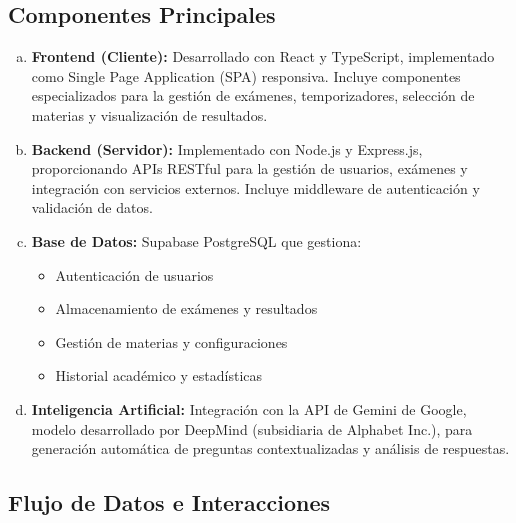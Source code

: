 \documentclass[12pt,a4paper]{report}
\begin{document}
\subsection{Componentes Principales}

\begin{enumerate}[a.]
\item \textbf{Frontend (Cliente):} Desarrollado con React y TypeScript, implementado como Single Page Application (SPA) responsiva. Incluye componentes especializados para la gestión de exámenes, temporizadores, selección de materias y visualización de resultados.

\item \textbf{Backend (Servidor):} Implementado con Node.js y Express.js, proporcionando APIs RESTful para la gestión de usuarios, exámenes y integración con servicios externos. Incluye middleware de autenticación y validación de datos.

\item \textbf{Base de Datos:} Supabase PostgreSQL que gestiona:
\begin{itemize}
\item Autenticación de usuarios
\item Almacenamiento de exámenes y resultados  
\item Gestión de materias y configuraciones
\item Historial académico y estadísticas
\end{itemize}

\item \textbf{Inteligencia Artificial:} Integración con la API de Gemini de Google, modelo desarrollado por DeepMind (subsidiaria de Alphabet Inc.), para generación automática de preguntas contextualizadas y análisis de respuestas.
\end{enumerate}

\subsection{Flujo de Datos e Interacciones}
\end{document}
